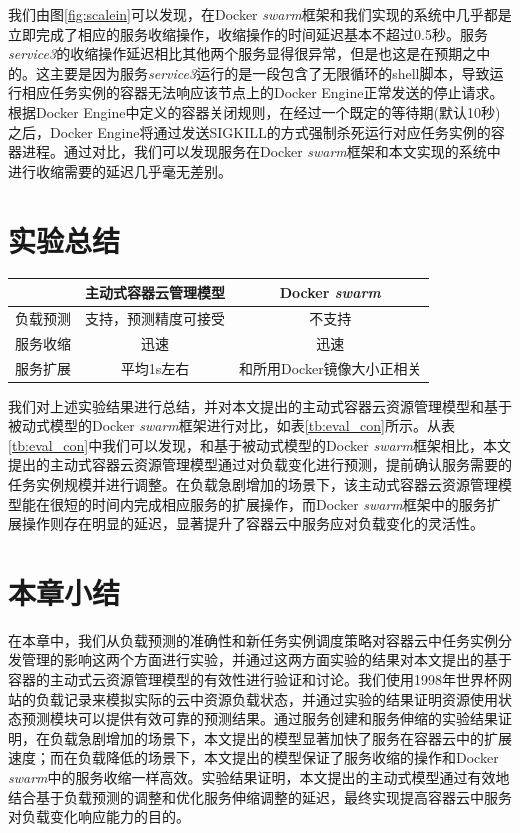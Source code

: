 我们由图\ref{fig:scalein}可以发现，在Docker \emph{swarm}框架和我们实现的系统中几乎都是立即完成了相应的服务收缩操作，收缩操作的时间延迟基本不超过0.5秒。服务\emph{service3}的收缩操作延迟相比其他两个服务显得很异常，但是也这是在预期之中的。这主要是因为服务\emph{service3}运行的是一段包含了无限循环的shell脚本，导致运行相应任务实例的容器无法响应该节点上的Docker Engine正常发送的停止请求。根据Docker Engine中定义的容器关闭规则，在经过一个既定的等待期(默认10秒)之后，Docker Engine将通过发送SIGKILL的方式强制杀死运行对应任务实例的容器进程。通过对比，我们可以发现服务在Docker \emph{swarm}框架和本文实现的系统中进行收缩需要的延迟几乎毫无差别。

\section{实验总结}
\begin{table}[H]
\centering
{}
\begin{tabular}{@{}lcc@{}}\toprule
  & 主动式容器云管理模型 & Docker \emph{swarm} \\ \midrule
 负载预测 & 支持，预测精度可接受 & 不支持 \\
 服务收缩 & 迅速 & 迅速 \\
 服务扩展 & 平均1s左右 & 和所用Docker镜像大小正相关 \\ \bottomrule
\end{tabular}
\end{table}

我们对上述实验结果进行总结，并对本文提出的主动式容器云资源管理模型和基于被动式模型的Docker \emph{swarm}框架进行对比，如表\ref{tb:eval_con}所示。从表\ref{tb:eval_con}中我们可以发现，和基于被动式模型的Docker \emph{swarm}框架相比，本文提出的主动式容器云资源管理模型通过对负载变化进行预测，提前确认服务需要的任务实例规模并进行调整。在负载急剧增加的场景下，该主动式容器云资源管理模型能在很短的时间内完成相应服务的扩展操作，而Docker \emph{swarm}框架中的服务扩展操作则存在明显的延迟，显著提升了容器云中服务应对负载变化的灵活性。

\section{本章小结}
在本章中，我们从负载预测的准确性和新任务实例调度策略对容器云中任务实例分发管理的影响这两个方面进行实验，并通过这两方面实验的结果对本文提出的基于容器的主动式云资源管理模型的有效性进行验证和讨论。我们使用1998年世界杯网站的负载记录来模拟实际的云中资源负载状态，并通过实验的结果证明资源使用状态预测模块可以提供有效可靠的预测结果。通过服务创建和服务伸缩的实验结果证明，在负载急剧增加的场景下，本文提出的模型显著加快了服务在容器云中的扩展速度；而在负载降低的场景下，本文提出的模型保证了服务收缩的操作和Docker \emph{swarm}中的服务收缩一样高效。实验结果证明，本文提出的主动式模型通过有效地结合基于负载预测的调整和优化服务伸缩调整的延迟，最终实现提高容器云中服务对负载变化响应能力的目的。
